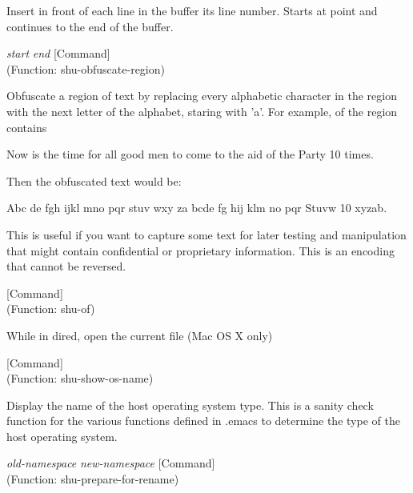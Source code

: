 \begin{doc-string}
Insert in front of each line in the buffer its line number.  Starts
at point and continues to the end of the buffer.
\end{doc-string}

\vspace{1em}
\noindent
{}
\usebox{\funcname}\emph{start} \emph{end}
 \hfill [Command]\\%
 (Function: shu-obfuscate-region)

\begin{doc-string}
Obfuscate a region of text by replacing every alphabetic character in the
region with the next letter of the alphabet, staring with 'a'. For example, of
the region contains

  Now is the time for all good men to come to the aid of the Party 10 times.

Then the obfuscated text would be:

  Abc de fgh ijkl mno pqr stuv wxy za bcde fg hij klm no pqr Stuvw 10 xyzab.

This is useful if you want to capture some text for later testing and
manipulation that might contain confidential or proprietary information.  This
is an encoding that cannot be reversed.
\end{doc-string}

\vspace{1em}
\noindent
{}
\usebox{\funcname}
 \hfill [Command]\\%
 (Function: shu-of)

\begin{doc-string}
While in dired, open the current file (Mac OS X only)
\end{doc-string}

\vspace{1em}
\noindent
{}
\usebox{\funcname}
 \hfill [Command]\\%
 (Function: shu-show-os-name)

\begin{doc-string}
Display the name of the host operating system type.  This is a sanity check
function for the various functions defined in .emacs to determine the type of
the host operating system.
\end{doc-string}

\vspace{1em}
\noindent
{}
\usebox{\funcname}\emph{old-namespace} \emph{new-namespace}
 \hfill [Command]\\%
 (Function: shu-prepare-for-rename)

